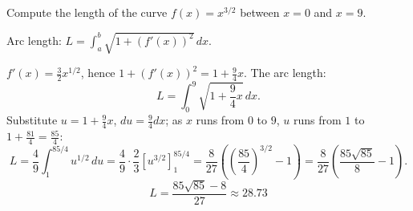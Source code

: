 
\begin{question}
Compute the length of the curve $f(x)=x^{3/2}$ between $x=0$ and $x=9$.
\end{question}

\begin{hint}
Arc length: $L=\int_a^b\sqrt{1+(f'(x))^2}\,dx$.
\end{hint}

\begin{solution}
$f'(x)=\frac32x^{1/2}$, hence $1+(f'(x))^2=1+\frac94x$. The arc length:
\[ L=\int_0^9\sqrt{1+\frac94x}\,dx. \]
Substitute $u=1+\frac94x$, $du=\frac94dx$; as $x$ runs from $0$ to $9$, $u$ runs from $1$ to $1+\frac{81}{4}=\frac{85}{4}$:
\[ L=\frac49\int_1^{85/4}u^{1/2}\,du=\frac49\cdot\frac23\left[u^{3/2}\right]_1^{85/4}=\frac{8}{27}\left(\left(\frac{85}{4}\right)^{3/2}-1\right)=\frac{8}{27}\left(\frac{85\sqrt{85}}{8}-1\right). \]
\[ \boxed{L=\frac{85\sqrt{85}-8}{27}\approx28.73} \]
\end{solution}
